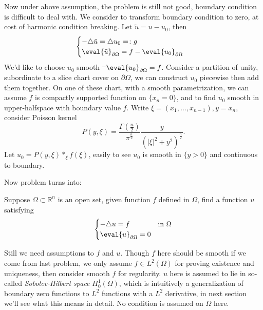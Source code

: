 \documentclass[UTF8,12pt]{article}
\numberwithin{theorem}{section}
\numberwithin{equation}{section}
\begin{document}
Now under above assumption, the problem is still not good, boundary condition is
difficult to deal with. We consider to transform boundary condition to zero, at
cost of harmonic condition breaking. Let \(\tilde{u}=u-u_0\), then \[
    \begin{cases}
        -\triangle \tilde{u}=\triangle u_0=\colon g \\
        \eval{\tilde{u}}_{\partial\Omega}=f-\eval{u_0}_{\partial\Omega}
    \end{cases}
\] We'd like to choose \(u_0\) smooth \st\ \(\eval{u_0}_{\partial\Omega}=f\).
Consider a partition of unity, subordinate to a slice chart cover on \(\partial
\Omega\), we can construct \(u_0\) piecewise then add them together. On one of these
chart, with a smooth parametrization, we can assume \(f\) is compactly supported
function on \(\{x_n=0\}\), and to find \(u_0\) smooth in upper-halfspace with
boundary value \(f\). Write \(\xi=(x_1,\ldots,x_{n-1}), y=x_n\), consider Poisson
kernel \[
    P(y,\xi)=\frac{\Gamma(\frac{n}{2})}{\pi^{\frac{n}{2}}}
    \frac{y}{(|\xi|^2+y^2)^{\frac{n}{2}}}
.\] Let \(u_0=P(y,\xi)*_{\xi}f(\xi)\), easily to see \(u_0\) is smooth in \(\{y>0\}\)
and continuous to boundary.

Now problem turns into:
\begin{problem}\label{prob:boundary-zero}
    Suppose \(\Omega\subset \mathbb{R}^n\) is an open set, given function \(f\)
    defined in \(\Omega\), find a function \(u\) satisfying \[
        \begin{cases}
            -\triangle u=f & \text{in }\Omega \\
            \eval{u}_{\partial\Omega}=0
        \end{cases}
    \] 
\end{problem}
Still we need assumptions to \(f\) and \(u\). Though \(f\) here should be smooth
if we come from last problem, we only assume \(f\in L^2(\Omega)\) for proving
existence and uniqueness, then consider smooth \(f\) for regularity. \(u\) here is
assumed to lie in so-called \emph{Sobolev-Hilbert space} \(H_0^1(\Omega)\), which is
intuitively a generalization of boundary zero functions to \(L^2\) functions with
a \(L^2\) derivative, in next section we'll see what this means in detail.
No condition is assumed on \(\Omega\) here.
\end{document}
